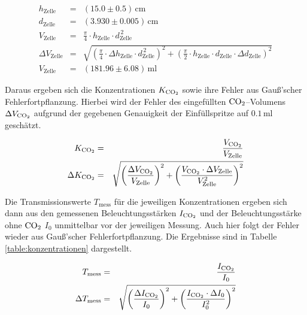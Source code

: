 \documentclass[12pt,a4paper]{scrartcl}
\numberwithin{equation}{section} %
\begin{document}
\begin{eqnarray}
	h_\mathrm{Zelle} &=& (15.0 \pm 0.5) \mathrm{\, cm} \\
	d_\mathrm{Zelle} &=& (3.930 \pm 0.005) \mathrm{\, cm} \\
	V_\mathrm{Zelle} &=& \frac{\pi}{4} \cdot h_\mathrm{Zelle} \cdot d_\mathrm{Zelle}^{\,2} \\
	\Delta V_\mathrm{Zelle}
		&=& \sqrt{
				\left(
					\frac{\pi}{4} \cdot \Delta h_\mathrm{Zelle}  \cdot d_\mathrm{Zelle}^{\,2}
				\right)^2
				+ \left(
					\frac{\pi}{2} \cdot h_\mathrm{Zelle} \cdot d_\mathrm{Zelle}\cdot \Delta d_\mathrm{Zelle}
				\right)^2
			} \\
	V_\mathrm{Zelle} &=& (181.96 \pm 6.08) \mathrm{\, ml}
\end{eqnarray}

\noindent
Daraus ergeben sich die Konzentrationen $K_{\ce{CO_2}}$ sowie ihre Fehler aus Gauß'scher Fehlerfortpflanzung.
Hierbei wird der Fehler des eingefüllten $\ce{CO_2}$--Volumens $\Delta V_{\ce{CO_2}}$ aufgrund der gegebenen Genauigkeit der Einfüllspritze auf $0.1 \mathrm{\, ml}$ geschätzt.

\begin{eqnarray}
	K_{\ce{CO_2}} &=& \frac{V_{\ce{CO_2}}}{V_\mathrm{Zelle}} \\
	\Delta K_{\ce{CO_2}}
		&=& \sqrt{
				\left(
					\frac{\Delta V_{\ce{CO_2}}}{V_\mathrm{Zelle}}
				\right)^2
				+ \left(
					\frac{V_{\ce{CO_2}} \cdot \Delta V_\mathrm{Zelle}}{V_\mathrm{Zelle}^2
				}\right)^2
			}
\end{eqnarray}

\noindent
Die Transmissionswerte $T_\mathrm{mess}$ für die jeweiligen Konzentrationen ergeben sich dann aus den gemessenen Beleuchtungsstärken $I_{\ce{CO_2}}$ und der Beleuchtungsstärke ohne $\ce{CO_2}$ $I_0$ unmittelbar vor der jeweiligen Messung. Auch hier folgt der Fehler wieder aus Gauß'scher Fehlerfortpflanzung. Die Ergebnisse sind in Tabelle \ref{table:konzentrationen} dargestellt.

\begin{eqnarray}
	T_\mathrm{mess} &=& \frac{I_{\ce{CO_2}}}{I_0} \\
	\Delta T_\mathrm{mess}
		&=&
			\sqrt{
				\left(
					\frac{\Delta I_{\ce{CO_2}}}{I_0}
				\right)^2
				+ \left(
					\frac{I_{\ce{CO_2}} \cdot \Delta I_0}{I_0^2}
				\right)^2
			}
\end{eqnarray}
\end{document}
